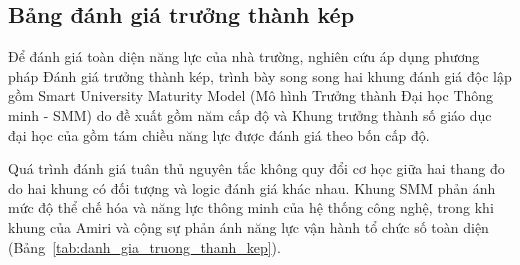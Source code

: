 \subsection{Bảng đánh giá trưởng thành kép}
Để đánh giá toàn diện năng lực của nhà trường, nghiên cứu áp dụng phương pháp Đánh giá trưởng thành kép, trình bày song song hai khung đánh giá độc lập gồm Smart University Maturity Model (Mô hình Trưởng thành Đại học Thông minh - SMM) do \citet{uskov2018} đề xuất gồm năm cấp độ và Khung trưởng thành số giáo dục đại học của \citet{amiri2026} gồm tám chiều năng lực được đánh giá theo bốn cấp độ.

Quá trình đánh giá tuân thủ nguyên tắc không quy đổi cơ học giữa hai thang đo do hai khung có đối tượng và logic đánh giá khác nhau. Khung SMM phản ánh mức độ thể chế hóa và năng lực thông minh của hệ thống công nghệ, trong khi khung của Amiri và cộng sự phản ánh năng lực vận hành tổ chức số toàn diện (Bảng~\ref{tab:danh_gia_truong_thanh_kep}).

